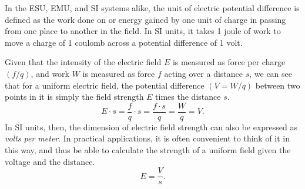 In the ESU, EMU, and SI systems alike, the unit of electric potential difference is
defined as the work done on or energy gained by one unit of charge in passing from
one place to another in the field. In SI units, it takes 1 joule of work to move
a charge of 1 coulomb across a potential difference of 1 volt. 

Given that the intensity of the electric field $E$ is measured as force per charge
$(f/q)$, and work $W$ is measured as force $f$ acting over a distance $s$, we can
see that for a uniform electric field, the potential difference $(V=W/q)$ between 
two points in it is simply the field strength $E$ times the distance $s$.
\begin{equation*}
E \cdot s = \frac{f}{q}\cdot s = \frac{f\cdot s}{q} = \frac{W}{q} = V.
\end{equation*}
In SI units, then, the dimension of electric field strength can also be expressed
as \emph{volts per meter}. In practical applications, it is often convenient to
think of it in this way, and thus be able to calculate the strength of a uniform field given
the voltage and the distance.
\begin{equation*}
E = \frac{V}{s}.
\end{equation*}
